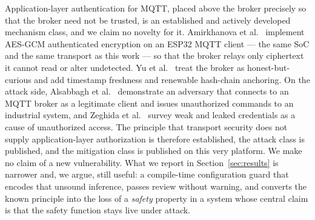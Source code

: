 Application-layer authentication for MQTT, placed above the broker precisely so that the broker
need not be trusted, is an established and actively developed mechanism class, and we claim no
novelty for it. Amirkhanova et al.~\cite{amirkhanova2026} implement AES-GCM authenticated
encryption on an ESP32 MQTT client --- the same SoC and the same transport as this work --- so
that the broker relays only ciphertext it cannot read or alter undetected. Yu et
al.~\cite{mqttl2026} treat the broker as honest-but-curious and add timestamp freshness and
renewable hash-chain anchoring. On the attack side, Alsabbagh et al.~\cite{pirates2024}
demonstrate an adversary that connects to an MQTT broker as a legitimate client and issues
unauthorized commands to an industrial system, and Zeghida et al.~\cite{zeghida2024} survey
weak and leaked credentials as a cause of unauthorized access. The principle that transport
security does not supply application-layer authorization is therefore established, the attack
class is published, and the mitigation class is published on this very platform. We make no
claim of a new vulnerability. What we report in Section~\ref{sec:results} is narrower and, we
argue, still useful: a compile-time configuration guard that encodes that unsound inference,
passes review without warning, and converts the known principle into the loss of a
\emph{safety} property in a system whose central claim is that the safety function stays live
under attack.

